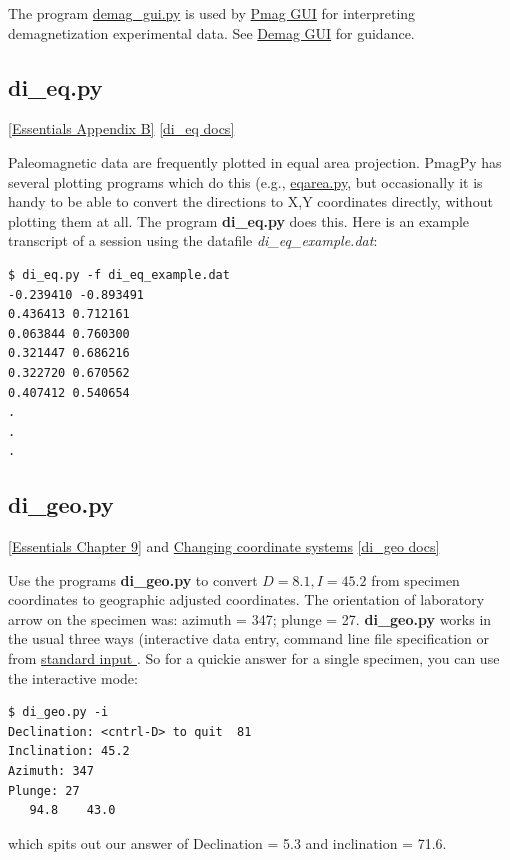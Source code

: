 \documentclass[11pt]{book}
\begin{document}
{{{The program \href{#DemagGUI}{demag\_gui.py} is used by \href{#pmag_gui.py}{Pmag GUI} for interpreting demagnetization experimental data.   See \href{#demag_gui.py}{Demag GUI} for guidance.


\subsection{di\_eq.py}
\href{http://earthref.org/MAGIC/books/Tauxe/Essentials/WebBook3ap2.html#equal_area}{[Essentials Appendix B]}
\href{https://github.com/PmagPy/PmagPy/blob/master/programs/di_eq.py}{[di\_eq docs]}

Paleomagnetic data are frequently plotted in equal area projection.  PmagPy has several plotting programs which do this (e.g., \href{#eqarea.py}{eqarea.py}, but occasionally it is handy to be able to convert the directions to X,Y coordinates directly, without plotting them at all.  The program {\bf di\_eq.py} does this.  Here is an example transcript of a session using the datafile {\it di\_eq\_example.dat}:

\begin{verbatim}
$ di_eq.py -f di_eq_example.dat
-0.239410 -0.893491
0.436413 0.712161
0.063844 0.760300
0.321447 0.686216
0.322720 0.670562
0.407412 0.540654
.
.
.
\end{verbatim}

\subsection{di\_geo.py}
\href{http://earthref.org/MAGIC/books/Tauxe/Essentials/WebBook3ch9.html#ch9}{[Essentials Chapter 9]} and
\href{http://earthref.org/MAGIC/books/Tauxe/Essentials/WebBook3ap1.html#Changing_coordinate_systems}{Changing coordinate systems}
\href{https://github.com/PmagPy/PmagPy/blob/master/programs/di_geo.py}{[di\_geo docs]}

Use the programs {\bf di\_geo.py}  to convert
$D=8.1, I=45.2$ from specimen coordinates  to geographic  adjusted coordinates. The
orientation of laboratory arrow on the specimen was: azimuth = 347;
plunge = 27.
{\bf di\_geo.py} works in the usual three ways (interactive data entry, command line file specification or from  \href{#standard_IO}{standard input }.  So for a quickie answer for a single specimen, you can use the interactive mode:

\begin{verbatim}
$ di_geo.py -i
Declination: <cntrl-D> to quit  81
Inclination: 45.2
Azimuth: 347
Plunge: 27
   94.8    43.0
\end{verbatim}
\noindent which spits out our answer of Declination = 5.3 and inclination = 71.6.

}}}
\end{document}
